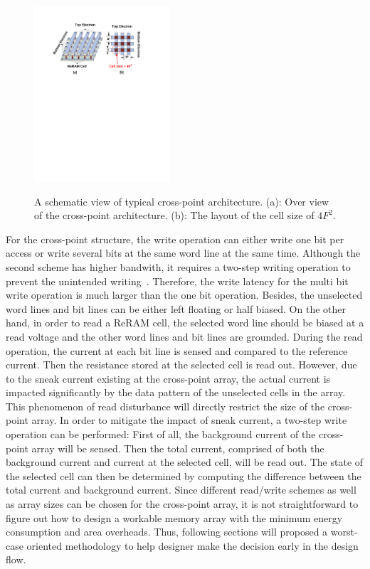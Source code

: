 \begin{figure}
\centering
  \includegraphics[width=0.45\textwidth]{./figures/crossbar_array2.pdf}\\\vspace{-10pt}
  \caption{A schematic view of typical cross-point architecture. (a): Over view of the cross-point architecture. (b): The layout of the cell size of $4F^2$. }\label{fig:array}
\vspace{-12pt}
\end{figure}

For the cross-point structure, the write operation can either write one bit per access or write several bits at the same word line at the same time. Although the second scheme has higher bandwith, it requires a two-step writing operation to prevent the unintended writing~\cite{memristor:Cong}. Therefore, the write latency for the multi bit write operation is much larger than the one bit operation. Besides, the unselected word lines and bit lines can be either left floating or half biased. On the other hand, in order to read a ReRAM cell, the selected word line should be biased at a read voltage and the other word lines and bit lines are grounded. During the read operation, the current at each bit line is sensed and compared to the reference current. Then the resistance stored at the selected cell is read out. However, due to the sneak current existing at the cross-point array, the actual current is impacted significantly by the data pattern of the unselected cells in the array. This phenomenon of read disturbance will directly restrict the size of the cross-point array. In order to mitigate the impact of sneak current, a two-step write operation can be performed: First of all, the background current of the cross-point array  will be sensed. Then the total current, comprised of both the background current and current at the selected cell, will be read out. The state of the selected cell can then be determined by computing the difference between the total current and background current. Since different read/write schemes as well as array sizes can be chosen for the cross-point array, it is not straightforward to figure out how to design a workable memory array with the minimum energy consumption and area overheads. Thus, following sections will proposed a worst-case oriented methodology to help designer make the decision early in the design flow.


